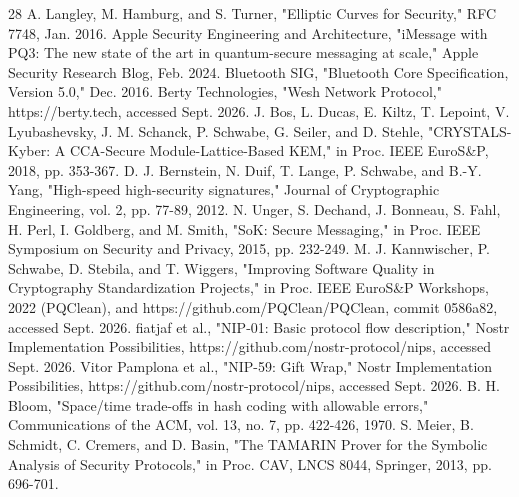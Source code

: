 \documentclass[conference]{IEEEtran}
\begin{document}
\begin{thebibliography}{28}
 A. Langley, M. Hamburg, and S. Turner, "Elliptic Curves for Security," RFC 7748, Jan. 2016.
 Apple Security Engineering and Architecture, "iMessage with PQ3: The new state of the art in quantum-secure messaging at scale," Apple Security Research Blog, Feb. 2024.
 Bluetooth SIG, "Bluetooth Core Specification, Version 5.0," Dec. 2016.
 Berty Technologies, "Wesh Network Protocol," https://berty.tech, accessed Sept. 2026.
 J. Bos, L. Ducas, E. Kiltz, T. Lepoint, V. Lyubashevsky, J. M. Schanck, P. Schwabe, G. Seiler, and D. Stehle, "CRYSTALS-Kyber: A CCA-Secure Module-Lattice-Based KEM," in Proc. IEEE EuroS\&P, 2018, pp. 353-367.
 D. J. Bernstein, N. Duif, T. Lange, P. Schwabe, and B.-Y. Yang, "High-speed high-security signatures," Journal of Cryptographic Engineering, vol. 2, pp. 77-89, 2012.
 N. Unger, S. Dechand, J. Bonneau, S. Fahl, H. Perl, I. Goldberg, and M. Smith, "SoK: Secure Messaging," in Proc. IEEE Symposium on Security and Privacy, 2015, pp. 232-249.
 M. J. Kannwischer, P. Schwabe, D. Stebila, and T. Wiggers, "Improving Software Quality in Cryptography Standardization Projects," in Proc. IEEE EuroS\&P Workshops, 2022 (PQClean), and https://github.com/PQClean/PQClean, commit 0586a82, accessed Sept. 2026.
 fiatjaf et al., "NIP-01: Basic protocol flow description," Nostr Implementation Possibilities, https://github.com/nostr-protocol/nips, accessed Sept. 2026.
 Vitor Pamplona et al., "NIP-59: Gift Wrap," Nostr Implementation Possibilities, https://github.com/nostr-protocol/nips, accessed Sept. 2026.
 B. H. Bloom, "Space/time trade-offs in hash coding with allowable errors," Communications of the ACM, vol. 13, no. 7, pp. 422-426, 1970.
 S. Meier, B. Schmidt, C. Cremers, and D. Basin, "The TAMARIN Prover for the Symbolic Analysis of Security Protocols," in Proc. CAV, LNCS 8044, Springer, 2013, pp. 696-701.
\end{thebibliography}
\end{document}
